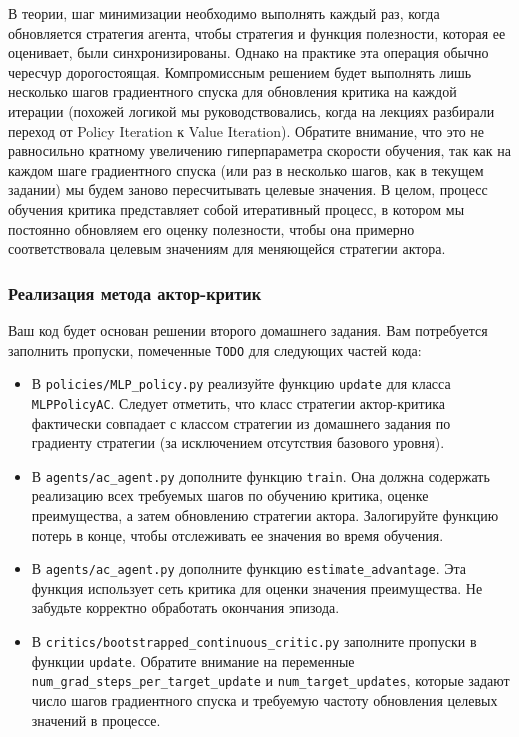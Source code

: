 \documentclass[12pt, oneside]{article}
\begin{document}
В теории, шаг минимизации необходимо выполнять каждый раз, когда обновляется стратегия агента, чтобы стратегия и функция полезности, которая ее оценивает, были синхронизированы. Однако на практике эта операция обычно чересчур дорогостоящая. Компромиссным решением будет выполнять лишь несколько шагов градиентного спуска для обновления критика на каждой итерации (похожей логикой мы руководствовались, когда на лекциях разбирали переход от Policy Iteration к Value Iteration). Обратите внимание, что это не равносильно кратному увеличению гиперпараметра скорости обучения, так как на каждом шаге градиентного спуска (или раз в несколько шагов, как в текущем задании) мы будем заново пересчитывать целевые значения. В целом, процесс обучения критика представляет собой итеративный процесс, в котором мы постоянно обновляем его оценку полезности, чтобы она примерно соответствовала целевым значениям для меняющейся стратегии актора.

\subsubsection{Реализация метода актор-критик}

Ваш код будет основан решении второго домашнего задания. Вам потребуется заполнить пропуски, помеченные \verb|TODO| для следующих частей кода:

\begin{itemize}
    \item В \verb|policies/MLP_policy.py| реализуйте функцию \verb|update| для класса \verb|MLPPolicyAC|. Следует отметить, что класс стратегии актор-критика фактически совпадает с классом стратегии из домашнего задания по градиенту стратегии (за исключением отсутствия базового уровня).
    \item В \verb|agents/ac_agent.py| дополните функцию \verb|train|. Она должна содержать реализацию всех требуемых шагов по обучению критика, оценке преимущества, а затем обновлению стратегии актора. Залогируйте функцию потерь в конце, чтобы отслеживать ее значения во время обучения.
    \item В \verb|agents/ac_agent.py| дополните функцию \verb|estimate_advantage|. Эта функция использует сеть критика для оценки значения преимущества. Не забудьте корректно обработать окончания эпизода.
    \item В \verb|critics/bootstrapped_continuous_critic.py| заполните пропуски в функции \verb|update|. Обратите внимание на переменные 
    \verb|num_grad_steps_per_target_update| и \verb|num_target_updates|, которые задают число шагов градиентного спуска и требуемую частоту обновления целевых значений в процессе.
\end{itemize}
\end{document}
